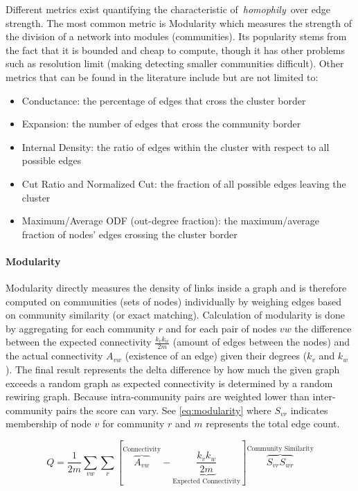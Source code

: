 \documentclass[
acmsmall,
nonacm,
screen,
acmthm]{acmart}
\providecommand{\tightlist}{%
\setlength{\itemsep}{0pt}\setlength{\parskip}{0pt}}
\begin{document}
Different metrics exist quantifying the characteristic
of~\emph{homophily}~over edge strength. The most common metric is
Modularity which measures the strength of the division of a network into
modules (communities). Its popularity stems from the fact that it is
bounded and cheap to compute, though it has other problems such as
resolution limit (making detecting smaller communities difficult). Other
metrics that can be found in the literature include but are not limited
to:

\begin{itemize}
\tightlist
\item
  Conductance: the percentage of edges that cross the cluster border
\item
  Expansion: the number of edges that cross the community border
\item
  Internal Density: the ratio of edges within the cluster with respect
  to all possible edges
\item
  Cut Ratio and Normalized Cut: the fraction of all possible edges
  leaving the cluster
\item
  Maximum/Average ODF (out-degree fraction): the maximum/average
  fraction of nodes' edges crossing the cluster border
\end{itemize}

\hypertarget{modularity}{%
\paragraph{Modularity}\label{modularity}}

Modularity directly measures the density of links inside a graph and is
therefore computed on communities (sets of nodes) individually by
weighing edges based on community similarity (or exact matching).
Calculation of modularity is done by aggregating for each community
\(r\) and for each pair of nodes \(vw\) the difference between the
expected connectivity \(\frac{k_{v} k_{w}}{2 m}\) (amount of edges
between the nodes) and the actual connectivity \(A_{vw}\) (existence of
an edge) given their degrees (\(k_v\) and \(k_w\)). The final result
represents the delta difference by how much the given graph exceeds a
random graph as expected connectivity is determined by a random rewiring
graph. Because intra-community pairs are weighted lower than
inter-community pairs the score can vary. See \cref{eq:modularity} where
\(S_{vr}\) indicates membership of node \(v\) for community \(r\) and
\(m\) represents the total edge count.

\begin{equation}
Q=\frac{1}{2 m}\sum_{v w}\sum_{r}\left[\overbrace{A_{v w}}^{\text{Connectivity}}-\underbrace{\frac{k_{v} k_{w}}{2 m}}_{\text{Expected Connectivity}}\right] \overbrace{S_{v r} S_{w r}}^{\text{Community Similarity}}
\label{eq:modularity}\end{equation}
\end{document}
